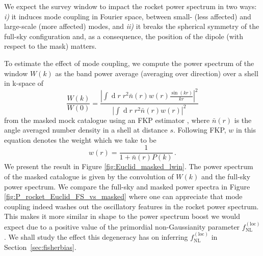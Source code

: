 \documentclass[a4paper,11pt]{article}
\renewcommand{\d}{\operatorname{d}}
\begin{document}
We expect the survey window to impact the rocket power spectrum in two ways: {\it i)}
 it  induces mode coupling in Fourier space, between small- (less affected)  and large-scale (more affected) modes, and 
    {\it ii)} it breaks the spherical symmetry of the full-sky configuration and, as a consequence, the position of the dipole (with respect to the mask) matters.

To estimate the effect of mode coupling, we compute the power spectrum of the window $W(k)$ as the band power average (averaging over direction) over a shell in k-space of
\begin{equation}
 \frac{W({k})}{W(0)}=\frac{\left\vert\int\d r\; r^2 \bar n(r)w(r)\frac{\sin(kr)}{kr}\right\vert^2}{\left\vert\int\d r\; r^2\bar n({ r})w(r)\right\vert^2}  
 \label{eq:windowpower}
\end{equation}
from the masked mock catalogue using an FKP estimator  \cite{Feldman:1993ky}, where $\bar n(r)$ is the angle averaged number density in a shell at distance $s$. Following FKP,  $w$ in this equation  denotes the weight which we take to be $$w(r)=\frac{1}{1+\bar n(r)P(k)}\,.$$We present the result in Figure \ref{fig:Euclid_masked_lwin}. The power spectrum of the masked catalogue is given by the convolution of $W(k)$ and the full-sky power spectrum.  We compare the full-sky and masked power spectra in Figure \ref{fig:P_rocket_Euclid_FS_vs_masked} where one can appreciate that mode coupling indeed washes out the oscillatory features in the rocket power spectrum.  This makes it more similar in shape to the power spectrum boost we would expect due to a positive value of the primordial non-Gaussianity parameter $f_\mathrm{NL}^\mathrm{(loc)}$. We shall study the effect this degeneracy has on inferring $f_\mathrm{NL}^\mathrm{(loc)}$ in Section~\ref{sec:fisherbias}.  
\end{document}
